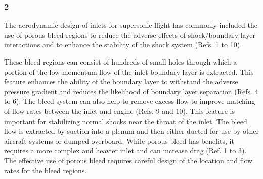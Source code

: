 \subsubsection{2}

The aerodynamic design of inlets for supersonic flight has commonly included the use of porous bleed regions to reduce the adverse effects of shock/boundary-layer interactions and to enhance the stability of the shock system (Refs. 1 to 10).











 These bleed regions can consist of hundreds of small holes through which a portion of the low-momentum flow of the inlet boundary layer is extracted. This feature enhances the ability of the boundary layer to withstand the adverse pressure gradient and reduces the likelihood of boundary layer separation (Refs. 4 to 6). The bleed system can also help to remove excess flow to improve matching of flow rates between the inlet and engine (Refs. 9 and 10). This feature is important for stabilizing normal shocks near the throat of the inlet. The bleed flow is extracted by suction into a plenum and then either ducted for use by other aircraft systems or dumped overboard. While porous bleed has benefits, it requires a more complex and heavier inlet and can increase drag (Ref. 1 to 3). The effective use of porous bleed requires careful design of the location and flow rates for the bleed regions.

